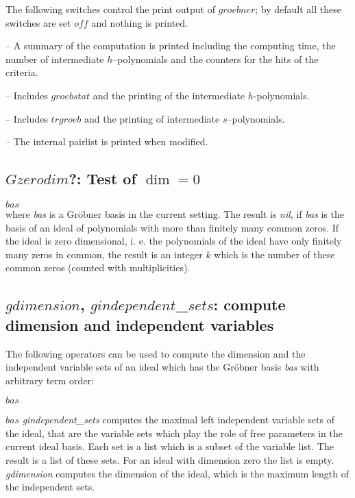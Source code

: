 The following switches control the print output of $groebner$; by
default all these switches are set $off$ and nothing is printed.
\begin{description}
\item[$groebstat$] -- A summary of the computation is printed
including the computing time, the number of intermediate
$h$--polynomials and the counters for the hits of the criteria.

\item[$trgroeb$] -- Includes $groebstat$ and the printing of the
intermediate $h$-polynomials.

\item[$trgroebs$] -- Includes $trgroeb$ and the printing of
intermediate $s$--poly\-nomials.

\item[$trgroeb1$] -- The internal pairlist is printed when modified.
\end{description}

\subsection{$Gzerodim$?: Test of $\dim = 0$}
\begin{description}
\item[{\it gzerodim}!?] $bas$ \\
where {\it bas} is a Gr\"obner basis in the current setting.
The result is {\it nil}, if {\it bas} is the
basis of an ideal of polynomials with more than finitely many common zeros.
If the ideal is zero dimensional, i. e. the polynomials of the ideal have only
finitely many zeros in common, the result is an integer $k$ which is the number
of these common zeros (counted with multiplicities).
\end{description}

\subsection{$gdimension$, $gindependent$\_$sets$: compute dimension and
independent variables}
The following operators can be used to compute the dimension
and the independent variable sets of an ideal which has the
Gr\"obner basis {\it bas} with arbitrary term order:
\begin{description}
\item[$gdimension$]$bas$
\item[$gindependent$\_$sets$]$bas$
{\it gindependent\_sets} computes the maximal
left independent variable sets of the ideal, that are
the variable sets which play the role of free parameters in the
current ideal basis. Each set is a list which is a subset of the
variable list. The result is a list of these sets. For an
ideal with dimension zero the list is empty.
{\it gdimension} computes the dimension of the ideal,
which is the maximum length of the independent sets.
\end{description}

